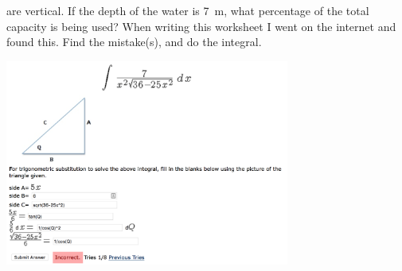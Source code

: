 \begin{questions}
            are vertical. If the depth of the water is \SI{7}{\metre}, what percentage of the total capacity is being used?
  \questioS When writing this worksheet I went on the internet and found this. Find the mistake(s), and do the integral.
            \begin{center}
              \includegraphics[width=0.7\textwidth]{misteaks1}
            \end{center}
\end{questions}


